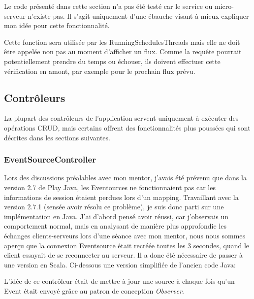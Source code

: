 \documentclass[french]{article}
\begin{document}
Le code présenté dans cette section n'a pas été testé car le service ou micro-serveur n'existe pas. Il s'agit uniquement d'une ébauche visant à mieux expliquer mon idée pour cette fonctionnalité.



Cette fonction sera utilisée par les RunningSchedulesThreads mais elle ne doit être appelée non pas au moment d'afficher un flux. Comme  la requête pourrait potentiellement prendre du temps ou échouer, ils doivent effectuer cette vérification en amont, par exemple pour le prochain flux prévu.
 
\newpage
\subsection{Contrôleurs}

La plupart des contrôleurs de l'application servent uniquement à exécuter des opérations CRUD, mais certains offrent des fonctionnalités plus poussées qui sont décrites dans les sections suivantes. 

\subsubsection{EventSourceController}

Lors des discussions préalables avec mon mentor, j'avais été prévenu que dans la version 2.7 de Play Java, les Eventources ne fonctionnaient pas car les informations de session étaient perdues lors d'un mapping. Travaillant avec la version 2.7.1 (sensée avoir résolu ce problème), je suis donc parti sur une implémentation en Java. J'ai d'abord pensé avoir réussi, car j'observais un comportement normal, mais en analysant de manière plus approfondie les échanges clients-serveurs lors d'une séance avec mon mentor, nous nous sommes aperçu que la connexion Eventsource était recréée toutes les 3 secondes, quand le client essayait de se reconnecter au serveur. Il a donc été nécessaire de passer à une version en Scala.\newline
Ci-dessous une version simplifiée de l'ancien code Java:



L'idée de ce contrôleur était de mettre à jour une source à chaque fois qu'un Event était envoyé grâce au patron de conception \textit{Observer}. 
\newpage
\end{document}
